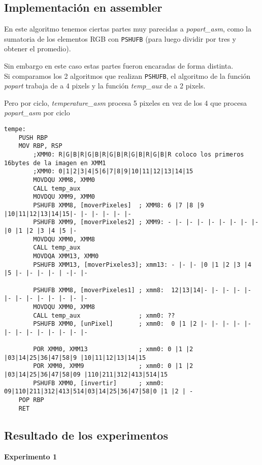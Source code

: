 \subsection{Implementaci\'on en assembler}
En este algoritmo tenemos ciertas partes muy parecidas a \textit{popart_asm}, como la sumatoria de los elementos RGB con \verb|PSHUFB| (para luego dividir por tres y obtener el promedio).

Sin embargo en este caso estas partes fueron encaradas de forma distinta. \\
Si comparamos los 2 algoritmos que realizan \verb|PSHUFB|, el algoritmo de la funci\'on \textit{popart} trabaja de a 4 pixels y la funci\'on \textit{temp_aux} de a 2 pixels.

Pero por ciclo, \textit{temperature_asm} procesa 5 pixeles en vez de los 4 que procesa \textit{popart_asm} por ciclo

\begin{codesnippet}
\begin{verbatim}
tempe:
    PUSH RBP
    MOV RBP, RSP
        ;XMM0: R|G|B|R|G|B|R|G|B|R|G|B|R|G|B|R coloco los primeros 16bytes de la imagen en XMM1
        ;XMM0: 0|1|2|3|4|5|6|7|8|9|10|11|12|13|14|15
        MOVDQU XMM8, XMM0
        CALL temp_aux
        MOVDQU XMM9, XMM0
        PSHUFB XMM8, [moverPixeles]  ; XMM8: 6 |7 |8 |9 |10|11|12|13|14|15|- |- |- |- |- |-
        PSHUFB XMM9, [moverPixeles2] ; XMM9: - |- |- |- |- |- |- |- |- |0 |1 |2 |3 |4 |5 |-
        MOVDQU XMM0, XMM8	
        CALL temp_aux
        MOVDQA XMM13, XMM0
        PSHUFB XMM13, [moverPixeles3]; xmm13: - |- |- |0 |1 |2 |3 |4 |5 |- |- |- |- | -|- |-

        PSHUFB XMM8, [moverPixeles1] ; xmm8:  12|13|14|- |- |- |- |- |- |- |- |- |- |- |- |-
        MOVDQU XMM0, XMM8
        CALL temp_aux                ; xmm0: ??
        PSHUFB XMM0, [unPixel]       ; xmm0:  0 |1 |2 |- |- |- |- |- |- |- |- |- |- |- |- |-

        POR XMM0, XMM13              ; xmm0: 0 |1 |2 |03|14|25|36|47|58|9 |10|11|12|13|14|15
        POR XMM0, XMM9               ; xmm0: 0 |1 |2 |03|14|25|36|47|58|09 |110|211|312|413|514|15
        PSHUFB XMM0, [invertir]      ; xmm0: 09|110|211|312|413|514|03|14|25|36|47|58|0 |1 |2 | -
    POP RBP
    RET
\end{verbatim}
\end{codesnippet}

\subsection{Resultado de los experimentos}
\vspace*{0.3cm} \noindent
\textbf{Experimento 1}


